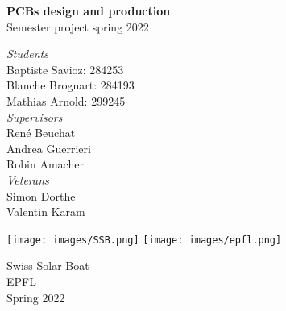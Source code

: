 \begin{titlepage}
    \begin{center}

        \Huge
        \textbf{PCBs design and production}\\
        Semester project spring 2022
        \vspace{0.5cm}
        \LARGE
        
            
        \vspace{1.5cm}

        \textit{Students} \\
        Baptiste Savioz: 284253\\ Blanche Brognart: 284193\\Mathias Arnold: 299245\\
        \vspace{0.8cm}
        \textit{Supervisors}\\
        René Beuchat\\
        Andrea Guerrieri\\
        Robin Amacher\\
         \vspace{0.5cm}
        \textit{Veterans}\\
        Simon Dorthe\\
        Valentin Karam\\

        \vfill
            
            
        \vspace{0.8cm}
        
        \texttt{[image: images/SSB.png]}
        \texttt{[image: images/epfl.png]}
        
        \Large
        Swiss Solar Boat\\
        EPFL\\
        Spring 2022
            
    \end{center}
\end{titlepage}